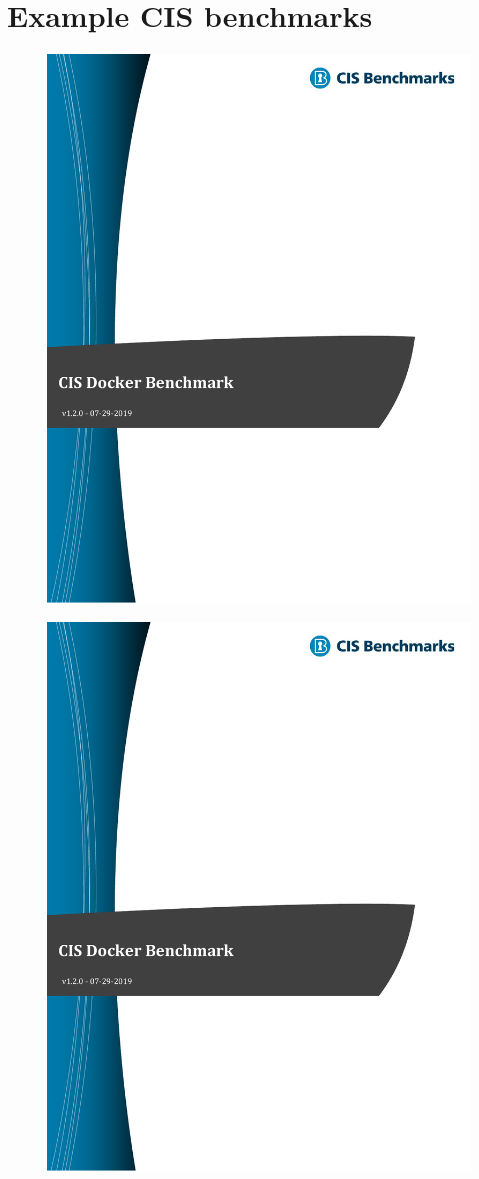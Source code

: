 \chapter{Example CIS benchmarks}\label{appendix:a}

\begin{figure}[ht]
    \centering
    \includegraphics[page=135,width=.8\textwidth]{resources/images/cis_docker_benchmarks.pdf}
\end{figure}

\pagebreak

\begin{figure}[ht]
    \centering
    \includegraphics[page=136,width=.8\textwidth]{resources/images/cis_docker_benchmarks.pdf}
\end{figure}

